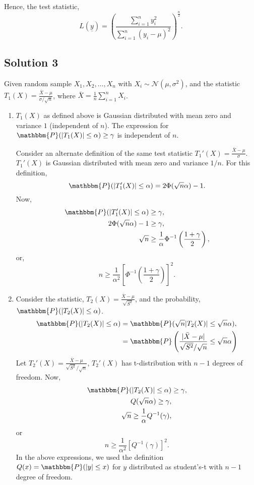 \documentclass[a4paper,english,12pt]{article}
\begin{document}
\begin{enumerate}[label=(\alph*).]
\begin{align*}
\end{align*}
Hence, the test statistic,
\begin{equation*}
L(\underline{y})=\left(\frac{\sum \limits_{i=1}^n y_i^2}{\sum \limits_{i=1}^n (y_i - \mu)^2}\right)^{\frac{n}{2}}.
\end{equation*}
\end{enumerate}
\hypertarget{solution3}{\subsection*{Solution 3}}
Given random sample $X_1,X_2,\dots,X_n$ with $X_i\sim \mathcal{N}(\mu,\sigma^2)$, and the statistic $T_1(X)=\frac{\bar{X}-\mu}{\sigma/\sqrt{n}}$, where  $\bar{X}=\frac{1}{n}\sum\limits_{i=1}^{n} X_i$.
\begin{enumerate}[label=(\alph*).]
\item $T_1(X)$ as defined above is Gaussian distributed with mean zero and variance $1$ (independent of $n$). The expression for $\mathbbm{P}(|T_1(X)|\leq\alpha)\geq \gamma$ is independent of $n$. 
\par Consider an alternate definition of the same test statistic $T_1'(X)=\frac{\bar{X}-\mu}{\sigma}$. $T_1'(X)$ is Gaussian distributed with mean zero and variance $1/n$. For this definition,
\begin{equation*}
\mathbbm{P}(|T_1'(X)|\leq\alpha)=2\Phi(\sqrt{n}\alpha)-1.
\end{equation*}
Now,
\begin{align*}
\mathbbm{P}(|T_1'(X)|\leq\alpha)&\geq \gamma,\\
2\Phi(\sqrt{n}\alpha)-1&\geq \gamma,\\
\sqrt{n}&\geq \frac{1}{\alpha}\Phi^{-1}\left(\frac{1+\gamma}{2}\right),
\end{align*}
or,
\begin{equation*}
n\geq \frac{1}{\alpha^2}\left[\Phi^{-1}\left(\frac{1+\gamma}{2}\right)\right]^2.
\end{equation*}
\item Consider the statistic, $T_2(X)=\frac{\bar{X}-\mu}{\sqrt{S^2}}$, and the probability, $\mathbbm{P}(|T_2(X)|\leq\alpha)$.
\begin{align*}
\mathbbm{P}(|T_2(X)|\leq\alpha)&=\mathbbm{P}(\sqrt{n}|T_2(X)|\leq\sqrt{n}\alpha),\\
&=\mathbbm{P}\left(\frac{|\bar{X}-\mu|}{\sqrt{S^2}/\sqrt{n}}\leq\sqrt{n}\alpha\right)
\end{align*}
Let $T_2'(X)=\frac{\bar{X}-\mu}{\sqrt{S^2}/\sqrt{n}}$, $T_2'(X)$ has t-distribution with $n-1$ degrees of freedom. Now,
\begin{align*}
\mathbbm{P}(|T_2(X)|\leq\alpha)&\geq \gamma,\\
Q(\sqrt{n}\alpha)\geq \gamma,\\
\sqrt{n}\geq \frac{1}{\alpha}Q^{-1}(\gamma),
\end{align*}
or 
\begin{equation*}
n \geq \frac{1}{\alpha^2}\left[Q^{-1}(\gamma)\right]^2.
\end{equation*}
In the above expressions, we used the definition $Q(x)=\mathbbm{P}(|y|\leq x)$ for $y$ distributed as student's-t with $n-1$ degree of freedom.
\end{enumerate}
\end{document}
